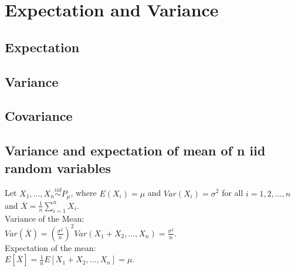 \section{Expectation and Variance}
\subsection*{Expectation}
\subsection*{Variance}
\subsection*{Covariance}
\subsection*{Variance and expectation of mean of n iid random variables}
Let $X_1, ..., X_n \stackrel{iid}{\sim} P_{\mu}$, where $E(X_i)=\mu$ and $Var(X_i)=\sigma^2$ for all $i=1,2,...,n$ and $\overline{X}= \frac{1}{n} \sum_{i=1}^{n} X_i$.\\

Variance of the Mean:\\

$Var(\overline{X})=(\frac{\sigma^2}{n})^2 Var(X_1 + X_2,...,X_n) =  \frac{\sigma^2}{n}$.\\

Expectation of the mean:\\

$E[\overline{X}]=\frac{1}{n}E[X_1 + X_2,...,X_n] = \mu$.